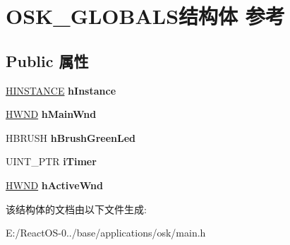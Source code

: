 \hypertarget{struct_o_s_k___g_l_o_b_a_l_s}{}\section{O\+S\+K\+\_\+\+G\+L\+O\+B\+A\+L\+S结构体 参考}
\label{struct_o_s_k___g_l_o_b_a_l_s}
\subsection*{Public 属性}
\begin{DoxyCompactItemize}
\item 
\mbox{\label{struct_o_s_k___g_l_o_b_a_l_s_a22cd2bcf316d15588451f286969ec1c0}} 
\hyperlink{interfacevoid}{H\+I\+N\+S\+T\+A\+N\+CE} {\bfseries h\+Instance}
\item 
\mbox{\label{struct_o_s_k___g_l_o_b_a_l_s_a6bd8241d373169a83f5fdfeb4b3b7838}} 
\hyperlink{interfacevoid}{H\+W\+ND} {\bfseries h\+Main\+Wnd}
\item 
\mbox{\label{struct_o_s_k___g_l_o_b_a_l_s_a9d366bcfc3024ebc4c80ec6c360456c8}} 
H\+B\+R\+U\+SH {\bfseries h\+Brush\+Green\+Led}
\item 
\mbox{\label{struct_o_s_k___g_l_o_b_a_l_s_a983d6ef3663c07fae60df3a9ba832bff}} 
U\+I\+N\+T\+\_\+\+P\+TR {\bfseries i\+Timer}
\item 
\mbox{\label{struct_o_s_k___g_l_o_b_a_l_s_aa334554b2b035a11cefd50d710707288}} 
\hyperlink{interfacevoid}{H\+W\+ND} {\bfseries h\+Active\+Wnd}
\end{DoxyCompactItemize}


该结构体的文档由以下文件生成\+:\begin{DoxyCompactItemize}
\item 
E\+:/\+React\+O\+S-\/0../base/applications/osk/main.\+h\end{DoxyCompactItemize}
